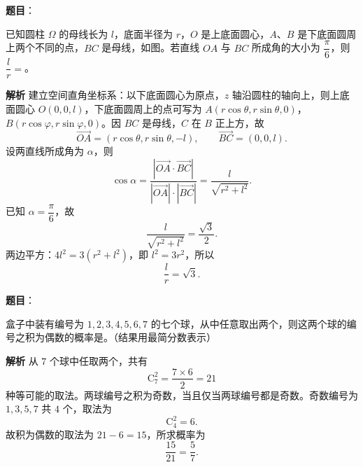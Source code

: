 \begin{answer}

\textbf{题目}：

已知圆柱 $\Omega$ 的母线长为 $l$，底面半径为 $r$，$O$ 是上底面圆心，$A$、$B$ 是下底面圆周上两个不同的点，$BC$ 是母线，如图。若直线 $OA$ 与 $BC$ 所成角的大小为 $\dfrac{\pi}{6}$，则 $\dfrac lr=$\gkblank{}。
\nopagebreak[4]
\begin{center}\end{center}
\nopagebreak[4]
\textbf{解析}
建立空间直角坐标系：以下底面圆心为原点，$z$ 轴沿圆柱的轴向上，则上底面圆心 $O(0,0,l)$，下底面圆周上的点可写为 $A(r\cos\theta,r\sin\theta,0)$，$B(r\cos\varphi,r\sin\varphi,0)$。因 $BC$ 是母线，$C$ 在 $B$ 正上方，故
\nopagebreak[4]
\[\overrightarrow{OA}=(r\cos\theta,r\sin\theta,-l),\qquad \overrightarrow{BC}=(0,0,l).\]
设两直线所成角为 $\alpha$，则
\nopagebreak[4]
\[\cos\alpha=\frac{\left|\overrightarrow{OA}\cdot\overrightarrow{BC}\right|}{|\overrightarrow{OA}|\cdot|\overrightarrow{BC}|}
=\frac{l}{\sqrt{r^2+l^2}}.\]
已知 $\alpha=\dfrac\pi6$，故
\nopagebreak[4]
\[\frac{l}{\sqrt{r^2+l^2}}=\frac{\sqrt3}2.\]
两边平方：$4l^2=3(r^2+l^2)$，即 $l^2=3r^2$，所以
\nopagebreak[4]
\[\frac lr=\sqrt3.\]


\end{answer}
\begin{answer}

\textbf{题目}：

盒子中装有编号为 $1,2,3,4,5,6,7$ 的七个球，从中任意取出两个，则这两个球的编号之积为偶数的概率是\gkblank{}。（结果用最简分数表示）

\textbf{解析}
从 $7$ 个球中任取两个，共有
\nopagebreak[4]
\[\mathrm C_7^2=\frac{7\times6}{2}=21\]
种等可能的取法。两球编号之积为奇数，当且仅当两球编号都是奇数。奇数编号为 $1,3,5,7$ 共 $4$ 个，取法为
\nopagebreak[4]
\[\mathrm C_4^2=6.\]
故积为偶数的取法为 $21-6=15$，所求概率为
\nopagebreak[4]
\[\frac{15}{21}=\frac57.\]


\end{answer}

